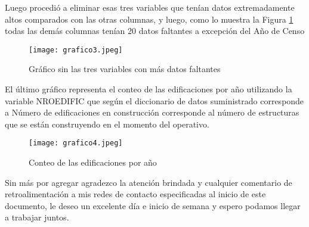 \documentclass[12pt]{article}
\begin{document}
Luego procedió a eliminar esas tres variables que tenían datos extremadamente altos comparados con las otras columnas, y luego, como lo muestra la Figura \ref{fig:Grafico-3} todas las demás columnas tenían 20 datos faltantes a excepción del Año de Censo

\begin{figure}[H] %
    \centering %
    \texttt{[image: grafico3.jpeg]}
    \caption{Gráfico sin las tres variables con más datos faltantes}
    \label{fig:Grafico-3}
\end{figure}
El último gráfico representa el conteo de las edificaciones por año utilizando la variable NROEDIFIC que según el diccionario de datos suministrado corresponde a  Número de edificaciones en construcción corresponde al número de estructuras que se están  construyendo en el momento del operativo. 
\begin{figure}[H] %
    \centering %
    \texttt{[image: grafico4.jpeg]}
    \caption{Conteo de las edificaciones por año}
    \label{fig:Grafico-4}
\end{figure}

Sin más por agregar agradezco la atención brindada y cualquier comentario de retroalimentación a mis redes de contacto especificadas al inicio de este documento, le deseo un excelente día e inicio de semana y espero podamos llegar a trabajar juntos.
\end{document}
